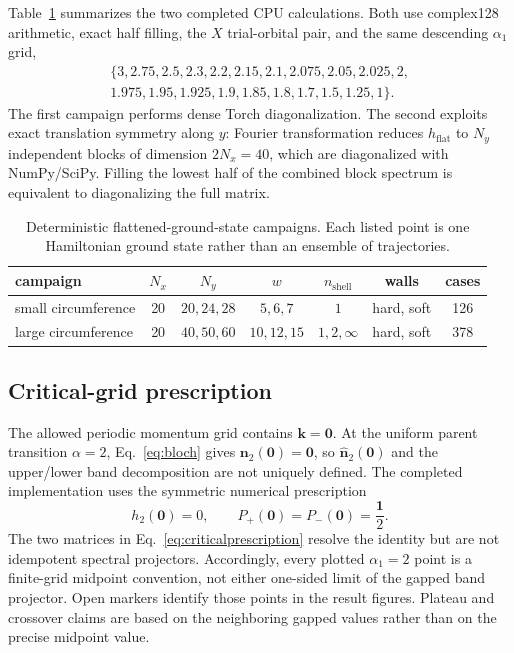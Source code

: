 \documentclass[aps,prb,twocolumn,nofootinbib,superscriptaddress,floatfix]{revtex4-2}
\newcommand{\hflat}{h_{\mathrm{flat}}}
\begin{document}
Table~\ref{tab:campaign} summarizes the two completed CPU calculations.  Both
use complex128 arithmetic, exact half filling, the $X$ trial-orbital pair,
and the same descending $\alpha_1$ grid,
\begin{multline}
 \{3,2.75,2.5,2.3,2.2,2.15,2.1,2.075,2.05,2.025,2,
 \\
 1.975,1.95,1.925,1.9,1.85,1.8,1.7,1.5,1.25,1\}.
 \label{eq:alphagrid}
\end{multline}
The first campaign performs dense Torch diagonalization.  The second exploits
exact translation symmetry along $y$: Fourier transformation reduces
$\hflat$ to $N_y$ independent blocks of dimension $2N_x=40$, which are
diagonalized with NumPy/SciPy.  Filling the lowest half of the combined block
spectrum is equivalent to diagonalizing the full matrix.

\begin{table}[t]
\caption{\label{tab:campaign}
Deterministic flattened-ground-state campaigns.  Each listed point is one
Hamiltonian ground state rather than an ensemble of trajectories.}
\begin{ruledtabular}
\begin{tabular}{lcccccc}
campaign & $N_x$ & $N_y$ & $w$ & $n_{\mathrm{shell}}$ & walls & cases \\
\hline
small circumference & 20 & $20,24,28$ & $5,6,7$ & $1$ & hard, soft & 126 \\
large circumference & 20 & $40,50,60$ & $10,12,15$ & $1,2,\infty$ & hard, soft & 378
\end{tabular}
\end{ruledtabular}
\end{table}

\subsection{Critical-grid prescription}

The allowed periodic momentum grid contains $\bm k=\bm0$.  At the uniform
parent transition $\alpha=2$, Eq.~\eqref{eq:bloch} gives
$\bm n_{2}(\bm0)=\bm0$, so $\widehat{\bm n}_{2}(\bm0)$ and the upper/lower
band decomposition are not uniquely defined.  The completed implementation
uses the symmetric numerical prescription
\begin{equation}
 h_{2}(\bm0)=0,
 \qquad P_+(\bm0)=P_-(\bm0)=\frac{\mathbf{1}}{2}.
 \label{eq:criticalprescription}
\end{equation}
The two matrices in Eq.~\eqref{eq:criticalprescription} resolve the identity
but are not idempotent spectral projectors.  Accordingly, every plotted
$\alpha_1=2$ point is a finite-grid midpoint convention, not either one-sided
limit of the gapped band projector.  Open markers identify those points in the
result figures.  Plateau and crossover claims are based on the neighboring
gapped values rather than on the precise midpoint value.
\end{document}
